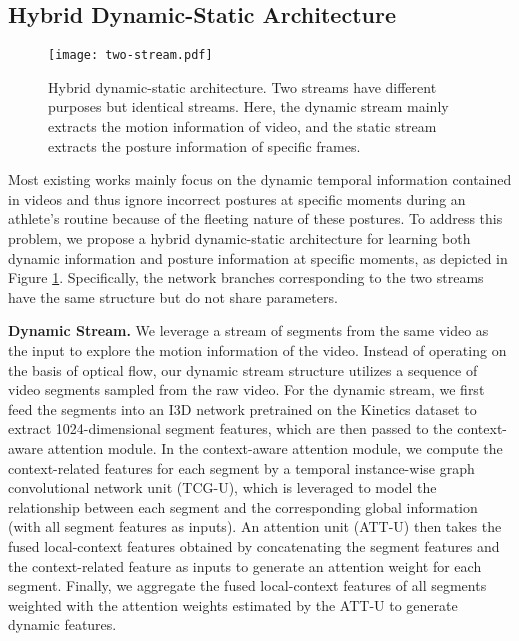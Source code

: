 \documentclass[sigconf]{acmart}
\begin{document}
\vspace{-0.1cm}
\subsection{Hybrid Dynamic-Static Architecture} \label{sec:archi}


\begin{figure}
 \centering
 \texttt{[image: two-stream.pdf]}
\vspace{-0.3cm}
\caption{Hybrid dynamic-static architecture. Two streams have different purposes but identical streams. Here, the dynamic stream mainly extracts the motion information of video, and the static stream extracts the posture information of specific frames.
}
 \label{ Dynamic-static hybrid Architecture}
\vspace{-0.5cm}
\end{figure}


Most existing works \cite{parmar2017learning,li2018scoringnet,li2018end,doughty2018s,doughty2019pros,xu2019learning} mainly focus on the dynamic temporal information contained in videos and thus ignore incorrect postures at specific moments during an athlete's routine because of the fleeting nature of these postures. To address this problem, we propose a hybrid dynamic-static architecture for learning both dynamic information and posture information at specific moments, as depicted in Figure \ref{ Dynamic-static hybrid Architecture}. Specifically, the network branches corresponding to the two streams have the same structure but do not share parameters.

\vspace{5pt}

\noindent\textbf{Dynamic Stream.} We leverage a stream of segments from the same video as the input to explore the motion information of the video. Instead of operating on the basis of optical flow, our dynamic stream structure utilizes a sequence of video segments sampled from the raw video. For the dynamic stream, we first feed the segments into an I3D network pretrained on the Kinetics dataset \cite{carreira2017quo} to extract 1024-dimensional segment features, which are then passed to the context-aware attention module. In the context-aware attention module, we compute the context-related features for each segment by a temporal instance-wise graph convolutional network unit (TCG-U), which is leveraged to model the relationship between 
each segment and the corresponding global information (with all segment features as inputs).
An attention unit (ATT-U) then takes the fused local-context features obtained by concatenating the segment features and the context-related feature as inputs to generate an attention weight for each segment. Finally, we aggregate the fused local-context features of all segments weighted with the attention weights estimated by the ATT-U to generate dynamic features.
\end{document}
